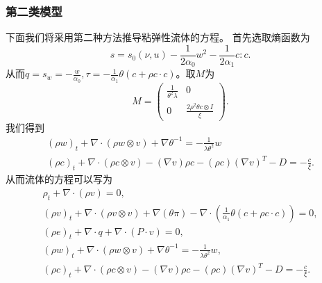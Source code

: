 \documentclass{article}
\begin{document}
	\subsubsection{第二类模型}
	下面我们将采用第二种方法推导粘弹性流体的方程。
	首先选取熵函数为
	\begin{equation*}
			s = s_0(\nu,u)  - \frac{1}{2  \alpha_0} w^2 - \frac{1}{2  \alpha_1} c:c.
	\end{equation*}
	从而$q=s_w=-\frac{ w}{\alpha_0},\tau = - \frac{1}{\alpha_1}  \theta ( c + \rho c \cdot c)$。取$M$为
	\begin{equation*}
		M = \left( \begin{array}{ccc} 
			\frac{1}{\theta^2 \lambda} & 0 \\
			0 &  \frac{2 \rho^2 \theta c \otimes I}{\xi}   
		\end{array} \right).
	\end{equation*}
	我们得到
\begin{eqnarray*}
			(\rho w)_t +  \nabla \cdot (\rho w \otimes v)  + \nabla \theta^{-1} = -\frac{1}{\lambda \theta^2}  w \\
			(\rho c)_t +  \nabla \cdot (\rho c \otimes v) - (\nabla v) \rho c - (\rho c) (\nabla v)^T - D = - \frac{c}{\xi} .
\end{eqnarray*}
从而流体的方程可以写为\begin{subequations}
		\begin{align*}
			\rho_t + \nabla \cdot (\rho v) = 0 ,\\
			(\rho v)_t + \nabla \cdot (\rho v \otimes v) + \nabla (\theta \pi)  - \nabla \cdot ( \frac{1}{\alpha_1}  \theta ( c + \rho c \cdot c)) =0 ,\\
			(\rho e)_t + \nabla \cdot q + \nabla \cdot (P \cdot v) = 0, \\
			(\rho w)_t + \nabla \cdot (\rho w \otimes v) + \nabla \theta^{-1} = -\frac{1}{\lambda \theta^2} w, \\
			(\rho c)_t +  \nabla \cdot (\rho c \otimes v) - (\nabla v) \rho c - (\rho c) (\nabla v)^T - D = - \frac{c}{\xi} .
		\end{align*}
	\end{subequations}
\end{document}
